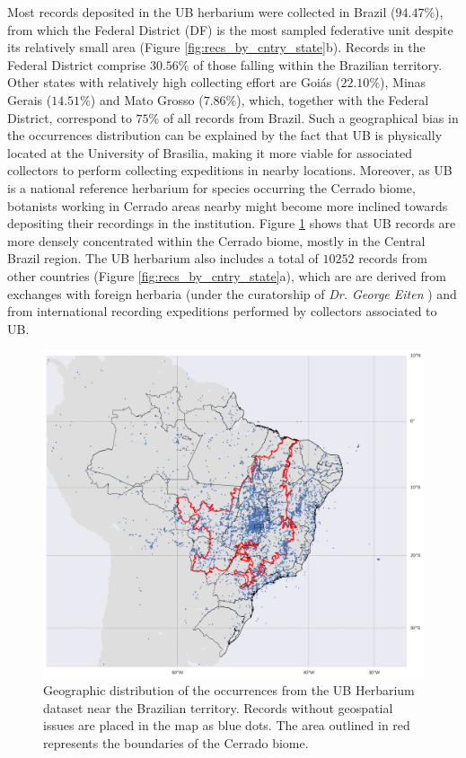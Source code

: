 Most records deposited in the UB herbarium were collected in Brazil ($94.47\%$), from which the Federal District (DF) is the most sampled federative unit despite its relatively small area (Figure \ref{fig:recs_by_cntry_state}b).
Records in the Federal District comprise $30.56\%$ of those falling within the Brazilian territory. 
Other states with relatively high collecting effort are Goiás ($22.10\%$), Minas Gerais ($14.51\%$) and Mato Grosso ($7.86\%$), which, together with the Federal District, correspond to $75\%$ of all records from Brazil.
Such a geographical bias in the occurrences distribution can be explained by the fact that UB is physically located at the University of Brasilia, making it more viable for associated collectors to perform collecting expeditions in nearby locations.
Moreover, as UB is a national reference herbarium for species occurring the Cerrado biome, botanists working in Cerrado areas nearby might become more inclined towards depositing their recordings in the institution.
Figure \ref{fig:occurrence_map} shows that UB records are more densely concentrated within the Cerrado biome, mostly in the Central Brazil region.
The UB herbarium also includes a total of $10252$ records from other countries (Figure \ref{fig:recs_by_cntry_state}a), which are are derived from exchanges with foreign herbaria (under the curatorship of \textit{Dr. George Eiten} \cite{florescer}) and from international recording expeditions performed by collectors associated to UB.


\begin{figure}[!htb]
\centering
\includegraphics[width=\linewidth]{figures/occurrence_map.png}
\caption[Geographic distribution of the occurrences from the UB Herbarium dataset near the Brazilian territory.]{Geographic distribution of the occurrences from the UB Herbarium dataset near the Brazilian territory. Records without geospatial issues are placed in the map as blue dots. The area outlined in red represents the boundaries of the Cerrado biome.}
\label{fig:occurrence_map}
\end{figure}

